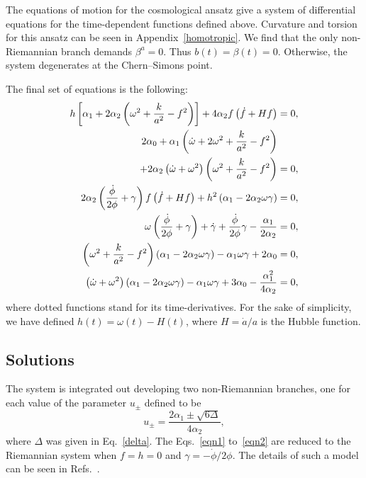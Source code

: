 \documentclass[aps,prd,12pt,superscriptaddress,showpacs,showkeys,longbibliography,reprint,nofootinbib]{revtex4-1}
\begin{document}
The equations of motion for the cosmological ansatz give a system of differential equations for the time-dependent functions defined above. Curvature and torsion for this ansatz can be seen in Appendix~\ref{homotropic}. We find that the only non-Riemannian branch demands  $\beta^a=0$. Thus $b(t)=\beta(t)=0$. Otherwise, the system degenerates at the Chern--Simons point. 

The final set of equations is the following:
\begin{align}
  \label{eqn1}
  h\left[\alpha_1+2\alpha_2\left(\omega^2+\frac{k}{a^2}-f^2\right)\right]+4\alpha_2f\left(\dot{f}+Hf\right)&=0,\\
  2\alpha_0+\alpha_1\left(\dot{\omega}+2\omega^2+\frac{k}{a^2}-f^2\right)\notag\\
  +2\alpha_2\left(\dot{\omega}+\omega^2\right)\left(\omega^2+\frac{k}{a^2}-f^2\right)&=0,\\
  2\alpha_2\left(\frac{\dot{\phi}}{2\phi}+\gamma\right)f\left(\dot{f}+Hf\right)
  +h^2\left(\alpha_1-2\alpha_2\omega\gamma\right)&=0,\\
  \omega\left(\frac{\dot{\phi}}{2\phi}+\gamma\right)+\dot{\gamma}+\frac{\dot{\phi}}{2\phi}\gamma-\frac{\alpha_1}{2\alpha_2}&=0,\\
  \left(\omega^2+\frac{k}{a^2}-f^2\right)\left(\alpha_1-2\alpha_2\omega\gamma\right)-\alpha_1\omega\gamma+2\alpha_0&=0,\\
  \label{eqn2}
  \left(\dot{\omega}+\omega^2\right)\left(\alpha_1-2\alpha_2\omega\gamma\right)-\alpha_1
  \omega\gamma+3\alpha_0-\frac{\alpha^2_1}{4\alpha_2}&=0,
\end{align}
where dotted functions stand for its time-derivatives. For the sake of simplicity, we have defined $h(t)=\omega(t)-H(t)$, where $H=\dot{a}/a$ is the Hubble function.

\subsection{Solutions}

The system is integrated out developing two non-Riemannian branches, one for each value of the parameter $u_\pm$ defined to be
\begin{equation}\label{u}
  u_\pm=\frac{2\alpha_1\pm\sqrt{6\Delta}}{4\alpha_2},
\end{equation}
where $\Delta$ was given in Eq.~\eqref{delta}. The Eqs.~\eqref{eqn1} to~\eqref{eqn2} are reduced to the Riemannian system when \mbox{$f=h=0$} and \mbox{$\gamma=-\dot{\phi}/2\phi$}. The details of such a model can be seen in Refs.~\cite{Deruelle:1986iv,Deruelle:2003ck,Henriques:1986jw,Ishihara:1986if,Kleidis:1997mu}.
\end{document}
